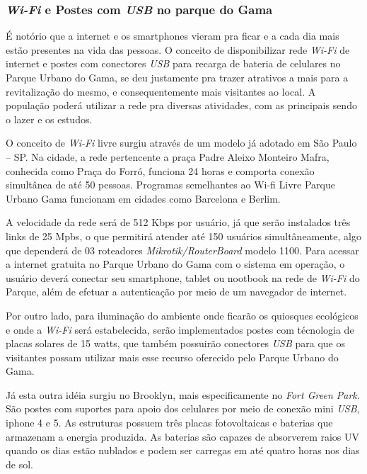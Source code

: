 \subsubsection{\textit{Wi-Fi} e Postes com \textit{USB} no parque do Gama}
	
	É notório que a internet e os smartphones vieram pra ficar e a cada dia mais estão  presentes na vida das pessoas. O conceito de disponibilizar rede \textit{Wi-Fi} de internet e postes com conectores \textit{USB} para recarga de bateria de celulares no Parque Urbano do Gama, se deu justamente pra trazer atrativos a mais para a revitalização do mesmo, e consequentemente mais visitantes ao local. A população poderá utilizar a rede pra diversas atividades, com as principais sendo o lazer e os estudos.

	O conceito de \textit{Wi-Fi} livre surgiu através de um modelo já adotado em São Paulo – SP. Na cidade, a rede pertencente a praça Padre Aleixo Monteiro Mafra, conhecida como Praça do Forró, funciona 24 horas e comporta conexão simultânea de até 50 pessoas. Programas semelhantes ao Wi-fi Livre Parque Urbano Gama funcionam em cidades como Barcelona e Berlim. 	

	A velocidade da rede será de 512 Kbps por usuário, já que serão instalados três links de 25 Mpbs, o que permitirá atender até 150 usuários simultâneamente, algo que dependerá de 03 roteadores \textit{Mikrotik/RouterBoard} modelo 1100. Para acessar a internet gratuita no Parque Urbano do Gama com o sistema em operação, o usuário deverá conectar seu smartphone, tablet ou nootbook na rede de \textit{Wi-Fi} do Parque, além de efetuar a autenticação por meio de um navegador de internet.
		
	Por outro lado, para iluminação do ambiente onde ficarão os quiosques ecológicos e onde a \textit{Wi-Fi} será estabelecida, serão implementados postes com técnologia de placas solares de 15 watts, que também possuirão conectores \textit{USB} para que os visitantes possam utilizar mais esse recurso oferecido pelo Parque Urbano do Gama.
	
	Já esta outra idéia surgiu no Brooklyn, mais especificamente no \textit{Fort Green Park}. São postes com suportes para apoio dos celulares por meio de conexão mini \textit{USB}, iphone 4 e 5. As estruturas possuem três placas fotovoltaicas e baterias que armazenam a energia produzida. As baterias são  capazes de absorverem raios UV quando os dias estão nublados e podem ser carregas em até quatro horas nos dias de sol.

